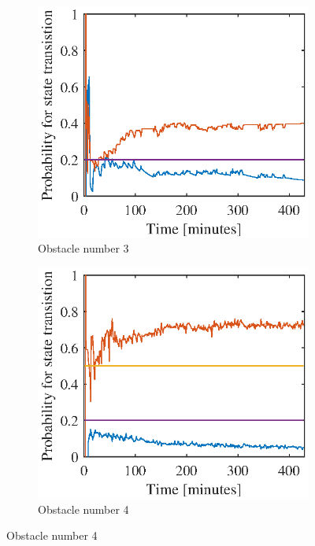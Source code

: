 \begin{figure}[htbp]
	\begin{subfigure}[t]{0.5\linewidth}
		\centering
		\includegraphics[width=1\linewidth]{chapters/appendix/figures/learning_curves/obs3}
		\caption{Obstacle number 3}
	\end{subfigure}
	\hspace*{\fill}
	\begin{subfigure}[t]{0.5\linewidth}
		\centering
		\includegraphics[width=1\linewidth]{chapters/appendix/figures/learning_curves/obs4}
		\caption{Obstacle number 4}
	\end{subfigure}
	

\end{figure}
